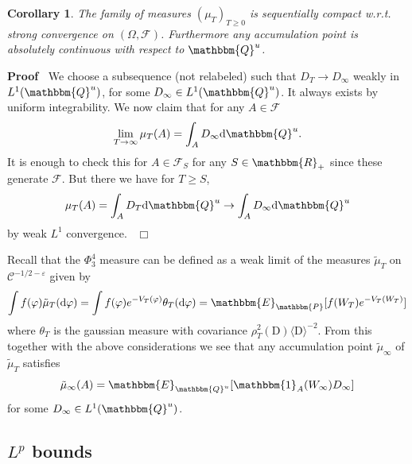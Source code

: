 \documentclass[11pt]{article}
\newcommand{\mathD}{\mathrm{D}}
\newcommand{\mathd}{\mathrm{d}}
\newenvironment{proof}{\noindent\textbf{Proof\ }}{\hspace*{\fill}$\Box$\medskip}
\newtheorem{corollary}{Corollary}
\newcommand{\VV}{\mathscr{C}}
\newcommand{\CF}{\mathscr{F}}
\begin{document}
\begin{corollary}
  The family of measures $(\mu_T)_{T \geqslant 0}$ is sequentially compact
  w.r.t. strong convergence on $\left( \Omega, \CF \right)$. Furthermore any
  accumulation point is absolutely continuous with respect to $\mathbbm{Q}^u$.
\end{corollary}

\begin{proof}
  We choose a subsequence (not relabeled) such that $D_T \rightarrow
  D_{\infty}$ weakly in $L^1 (\mathbbm{Q}^u)$, for some $D_{\infty} \in L^1
  (\mathbbm{Q}^u)$. It always exists by uniform integrability. We now claim
  that for any $A \in \CF$
  \[ \lim_{T \rightarrow \infty} \mu_T (A) = \int_A D_{\infty} \mathd
     \mathbbm{Q}^u_{} . \]
  It is enough to check this for $A \in \CF_S$ for any $S \in \mathbbm{R}_+$
  since these generate $\CF$. But there we have for $T \geqslant S$,
  \[ \mu_T (A) = \int_A D_T \mathd \mathbbm{Q}^u_{} \rightarrow \int_A
     D_{\infty} \mathd \mathbbm{Q}^u_{} \]
  by weak $L^1$ convergence. \ 
\end{proof}

Recall that the $\Phi_3^4$ measure can be defined as a weak limit of the
measures $\tilde{\mu}_T$ on $\VV^{- 1 / 2 - \varepsilon}$ given by
\[ \int f (\varphi) \tilde{\mu}_T (\mathd \varphi) = \int f (\varphi) e^{-
   V_T (\varphi)} \theta_T (\mathd \varphi) =\mathbbm{E}_{\mathbbm{P}} [f
   (W_T) e^{- V_T (W_T)}] \]
where $\theta_T$ is the gaussian measure with covariance $\rho^2_T (\mathD)
\langle \mathD \rangle^{- 2}$. From this together with the above
considerations we see that any accumulation point $\tilde{\mu}_{\infty}$ of
$\tilde{\mu}_T$ satisfies
\begin{equation}
  \tilde{\mu}_{\infty} (A) =\mathbbm{E}_{\mathbbm{Q}^u} [\mathbbm{1}_A
  (W_{\infty}) D_{\infty}] \label{eq:Phi4def}
\end{equation}
for some $D_{\infty} \in L^1 (\mathbbm{Q}^u)$.

\subsection{$L^p$ bounds}\label{sec:lp-bounds}
\end{document}
